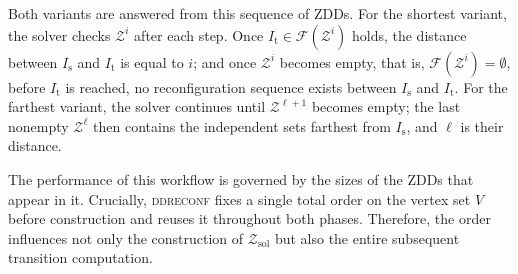 \documentclass[conference]{IEEEtran}
\newcommand{\ini}{\mathrm{s}}
\newcommand{\tar}{\mathrm{t}}
\newcommand{\Z}{\mathcal{Z}}
\newcommand{\sets}{\mathcal{F}}
\newcommand{\zind}{\mathcal{Z}_{\mathrm{ind}}}
\newcommand{\zsol}{\mathcal{Z}_{\mathrm{sol}}}
\begin{document}
Both variants are answered from this sequence of ZDDs. For the shortest variant,
the solver checks $\Z^{i}$ after each step.
Once $I_\tar \in \sets(\Z^{i})$ holds, the distance between $I_\ini$ and $I_\tar$ is equal to $i$; 
and once $\Z^{i}$ becomes empty, that is, $\sets(\Z^{i}) = \emptyset$, before $I_\tar$ is reached, no
reconfiguration sequence exists between $I_\ini$ and $I_\tar$.
For the farthest variant, the solver continues until $\Z^{\ell+1}$ becomes empty;
the last nonempty $\Z^{\ell}$ then contains the independent sets farthest from
$I_\ini$, and $\ell$ is their distance.

The performance of this workflow is governed by the sizes of the ZDDs that appear
in it. Crucially, \textsc{ddreconf} fixes a single total order on the vertex set $V$ before
construction and reuses it throughout both phases.
Therefore, the order influences not
only the construction of $\zsol$ but also the entire subsequent transition
computation.

\end{document}

